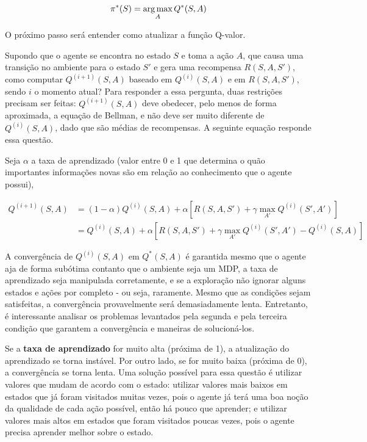 \begin{equation} \label{eq:q_opt_pol}
\pi^{*}(S) = \operatorname*{arg\,max}_{A}Q^{*}(S,A)
\end{equation}

O próximo passo será entender como atualizar a função Q-valor.

Supondo que o agente se encontra no estado $S$ e toma a ação $A$, que causa uma transição no ambiente para o estado $S'$ e gera uma recompensa $R(S,A,S')$, como computar $Q^{(i+1)}(S,A)$ baseado em $Q^{(i)}(S,A)$ e em $R(S,A,S')$, sendo $i$ o momento atual? Para responder a essa pergunta, duas restrições precisam ser feitas: $Q^{(i+1)}(S,A)$ deve obedecer, pelo menos de forma aproximada, a equação de Bellman, e não deve ser muito diferente de $Q^{(i)}(S,A)$, dado que são médias de recompensas. A seguinte equação responde essa questão.

Seja $\alpha$ a taxa de aprendizado (valor entre 0 e 1 que determina o quão importantes informações novas são em relação ao conhecimento que o agente possui),

\begin{equation} \label{eq:q_update}
\begin{align*}
Q^{(i+1)}(S,A) &= (1-\alpha)Q^{(i)}(S,A) + \alpha[R(S,A,S') + \gamma \max_{A'}Q^{(i)}(S',A')] \\
            &= Q^{(i)}(S,A) + \alpha[R(S,A,S') + \gamma \max_{A'}Q^{(i)}(S',A') - Q^{(i)}(S,A)]
\end{align*}
\end{equation}

A convergência de $Q^{(i)}(S,A)$ em $Q^{*}(S,A)$ é garantida mesmo que o agente aja de forma subótima contanto que o ambiente seja um MDP, a taxa de aprendizado seja manipulada corretamente, e se a exploração não ignorar alguns estados e ações por completo - ou seja, raramente. Mesmo que as condições sejam satisfeitas, a convergência provavelmente será demasiadamente lenta. Entretanto, é interessante analisar os problemas levantados pela segunda e pela terceira condição que garantem a convergência e maneiras de solucioná-los.

Se a \textbf{taxa de aprendizado} for muito alta (próxima de 1), a atualização do aprendizado se torna instável.
Por outro lado, se for muito baixa (próxima de 0), a convergência se torna lenta.
Uma solução possível para essa questão é utilizar valores que mudam de acordo com o estado: utilizar valores mais baixos em estados que já foram visitados muitas vezes, pois o agente já terá uma boa noção da qualidade de cada ação possível, então há pouco que aprender; e utilizar valores mais altos em estados que foram visitados poucas vezes, pois o agente precisa aprender melhor sobre o estado.


